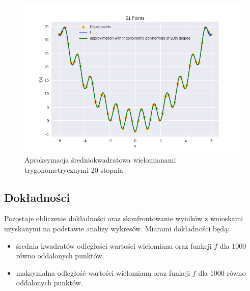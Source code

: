 \documentclass{article}
\begin{document}
\begin{figure}[H]
    \centering
    \includegraphics[width=\textwidth]{img/tripoly_20_51.png}
    \caption{Aproksymacja średniokwadratowa wielomianami trygonometrycznymi 20 stopnia}
\end{figure}

\subsection{Dokładności}
Pozostaje obliczenie dokładności oraz skonfrontowanie wyników z wnioskami uzyskanymi na podstawie analizy wykresów. Miarami dokładności będą:
\begin{itemize}
    \item
    średnia kwadratów odległości wartości wielomianu oraz funkcji $f$ dla 1000 równo oddalonych punktów,
    \item
    maksymalna odległość wartości wielomianu oraz funkcji $f$ dla 1000 równo oddalonych punktów.
\end{itemize}
\end{document}
